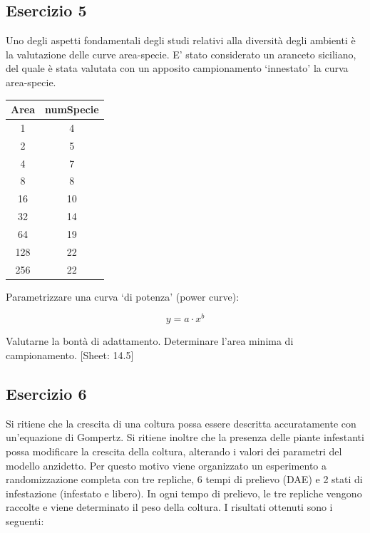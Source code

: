 \documentclass[a4paper,12pt,oneside]{book}
\begin{document}
\hypertarget{esercizio-5-6}{%
\subsection{Esercizio 5}\label{esercizio-5-6}}

Uno degli aspetti fondamentali degli studi relativi alla diversità degli ambienti è la valutazione delle curve area-specie. E' stato considerato un aranceto siciliano, del quale è stata valutata con un apposito campionamento `innestato' la curva area-specie.

\begin{longtable}[]{@{}cc@{}}
\toprule()
Area & numSpecie \\
\midrule()
\endhead
1 & 4 \\
2 & 5 \\
4 & 7 \\
8 & 8 \\
16 & 10 \\
32 & 14 \\
64 & 19 \\
128 & 22 \\
256 & 22 \\
\bottomrule()
\end{longtable}

Parametrizzare una curva `di potenza' (power curve):

\[y = a \cdot x^b\]

Valutarne la bontà di adattamento. Determinare l'area minima di campionamento.
{[}Sheet: 14.5{]}

\hypertarget{esercizio-6-4}{%
\subsection{Esercizio 6}\label{esercizio-6-4}}

Si ritiene che la crescita di una coltura possa essere descritta accuratamente con un'equazione di Gompertz. Si ritiene inoltre che la presenza delle piante infestanti possa modificare la crescita della coltura, alterando i valori dei parametri del modello anzidetto. Per questo motivo viene organizzato un esperimento a randomizzazione completa con tre repliche, 6 tempi di prelievo (DAE) e 2 stati di infestazione (infestato e libero). In ogni tempo di prelievo, le tre repliche vengono raccolte e viene determinato il peso della coltura. I risultati ottenuti sono i seguenti:
\end{document}
